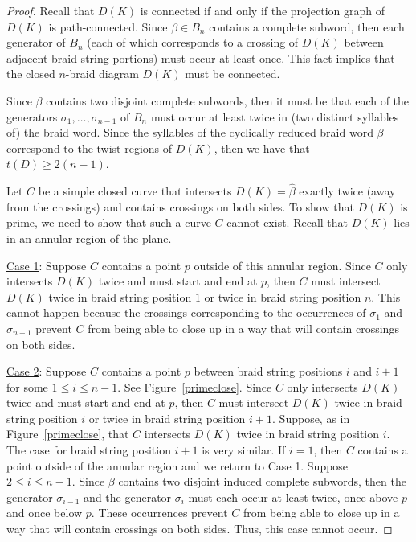 \documentclass{article}
\begin{document}
\begin{proof} Recall that $D(K)$ is connected if and only if the projection graph of $D(K)$ is path-connected. Since $\beta \in B_{n}$ contains a complete subword, then each generator of $B_{n}$ (each of which corresponds to a crossing of $D(K)$ between adjacent braid string portions) must occur at least once. This fact implies that the closed $n$-braid diagram $D(K)$ must be connected. 

Since $\beta$ contains two disjoint complete subwords, then it must be that each of the generators $\sigma_{1}, \ldots, \sigma_{n-1}$ of $B_{n}$ must occur at least twice in (two distinct syllables of) the braid word. Since the syllables of the cyclically reduced braid word $\beta$ correspond to the twist regions of $D(K)$, then we have that $t(D) \geq 2(n-1)$. 

Let $C$ be a simple closed curve that intersects $D(K)=\widehat{\beta}$ exactly twice (away from the crossings) and contains crossings on both sides. To show that $D(K)$ is prime, we need to show that such a curve $C$ cannot exist. Recall that $D(K)$ lies in an annular region of the plane. 

%

\bigskip

\noindent \underline{Case 1}: Suppose $C$ contains a point $p$ outside of this annular region. Since $C$ only intersects $D(K)$ twice and must start and end at $p$, then $C$ must intersect $D(K)$ twice in braid string position $1$ or twice in braid string position $n$. This cannot happen because the crossings corresponding to the occurrences of $\sigma_{1}$ and $\sigma_{n-1}$ prevent $C$ from being able to close up in a way that will contain crossings on both sides. 

\bigskip

\noindent \underline{Case 2}: Suppose $C$ contains a point $p$ between braid string positions $i$ and $i+1$ for some $1 \leq i \leq n-1$. See Figure~\ref{primeclose}. Since $C$ only intersects $D(K)$ twice and must start and end at $p$, then $C$ must intersect $D(K)$ twice in braid string position $i$ or twice in braid string position $i+1$. Suppose, as in Figure~\ref{primeclose}, that $C$ intersects $D(K)$ twice in braid string position $i$. The case for braid string position $i+1$ is very similar. If $i=1$, then $C$ contains a point outside of the annular region and we return to Case 1. Suppose $2 \leq i  \leq n-1$. Since $\beta$ contains two disjoint induced complete subwords, then the generator $\sigma_{i-1}$ and the generator $\sigma_{i}$ must each occur at least twice, once above $p$ and once below $p$. These occurrences prevent $C$ from being able to close up in a way that will contain crossings on both sides. Thus, this case cannot occur. 
\end{proof}
\end{document}
